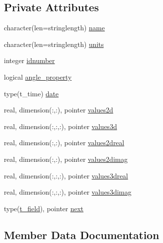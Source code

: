 \subsection*{Private Attributes}
\begin{DoxyCompactItemize}
\item 
character(len=stringlength) \mbox{\hyperlink{structmoduleinterpolategrids_1_1t__field_a5c762ad863d4b12f56f05a30128e800e}{name}}
\item 
character(len=stringlength) \mbox{\hyperlink{structmoduleinterpolategrids_1_1t__field_aae35ec16114357940275b1153d181fb1}{units}}
\item 
integer \mbox{\hyperlink{structmoduleinterpolategrids_1_1t__field_aae94e74759137a5be981f638eae8b9d0}{idnumber}}
\item 
logical \mbox{\hyperlink{structmoduleinterpolategrids_1_1t__field_af62b6f6d22527cc0734892e06654ad41}{angle\+\_\+property}}
\item 
type(t\+\_\+time) \mbox{\hyperlink{structmoduleinterpolategrids_1_1t__field_afa283d397e02c853aeef7ed90ff3adac}{date}}
\item 
real, dimension(\+:,\+:), pointer \mbox{\hyperlink{structmoduleinterpolategrids_1_1t__field_a0a492dcfd3852f297f0ad736229430a3}{values2d}}
\item 
real, dimension(\+:,\+:,\+:), pointer \mbox{\hyperlink{structmoduleinterpolategrids_1_1t__field_a34215aa8d3cedb1c61858f7dc1240e11}{values3d}}
\item 
real, dimension(\+:,\+:), pointer \mbox{\hyperlink{structmoduleinterpolategrids_1_1t__field_a19af3c269050a3de719e88a4bcbd99d6}{values2dreal}}
\item 
real, dimension(\+:,\+:), pointer \mbox{\hyperlink{structmoduleinterpolategrids_1_1t__field_ac2e11df63f28207cb53550977218ffda}{values2dimag}}
\item 
real, dimension(\+:,\+:,\+:), pointer \mbox{\hyperlink{structmoduleinterpolategrids_1_1t__field_afa90ea6f3b62bcfa73f2a3824cbc72d5}{values3dreal}}
\item 
real, dimension(\+:,\+:,\+:), pointer \mbox{\hyperlink{structmoduleinterpolategrids_1_1t__field_ae0e19e62708dc5505fd9c608adc54338}{values3dimag}}
\item 
type(\mbox{\hyperlink{structmoduleinterpolategrids_1_1t__field}{t\+\_\+field}}), pointer \mbox{\hyperlink{structmoduleinterpolategrids_1_1t__field_a51cbd6332ec118fe9d1c829fc0c5dc63}{next}}
\end{DoxyCompactItemize}


\subsection{Member Data Documentation}
\mbox{\label{structmoduleinterpolategrids_1_1t__field_af62b6f6d22527cc0734892e06654ad41}} 
